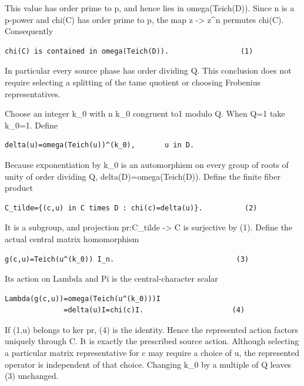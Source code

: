 This value has order prime to p, and hence lies in omega(Teich(D)).
Since n is a p-power and chi(C) has order prime to p, the map z
-\textgreater{} z\^{}n permutes chi(C). Consequently

\begin{Verbatim}[fontsize=\small,breaklines=true,breakanywhere=true]
chi(C) is contained in omega(Teich(D)).                 (1)
\end{Verbatim}

In particular every source phase has order dividing Q. This conclusion
does not require selecting a splitting of the tame quotient or choosing
Frobenius representatives.

Choose an integer k\_0 with n k\_0 congruent to1 modulo Q. When Q=1 take
k\_0=1. Define

\begin{Verbatim}[fontsize=\small,breaklines=true,breakanywhere=true]
delta(u)=omega(Teich(u))^(k_0),       u in D.
\end{Verbatim}

Because exponentiation by k\_0 is an automorphism on every group of
roots of unity of order dividing Q, delta(D)=omega(Teich(D)). Define the
finite fiber product

\begin{Verbatim}[fontsize=\small,breaklines=true,breakanywhere=true]
C_tilde={(c,u) in C times D : chi(c)=delta(u)}.          (2)
\end{Verbatim}

It is a subgroup, and projection pr:C\_tilde -\textgreater{} C is
surjective by (1). Define the actual central matrix homomorphism

\begin{Verbatim}[fontsize=\small,breaklines=true,breakanywhere=true]
g(c,u)=Teich(u^(k_0)) I_n.                             (3)
\end{Verbatim}

Its action on Lambda and Pi is the central-character scalar

\begin{Verbatim}[fontsize=\small,breaklines=true,breakanywhere=true]
Lambda(g(c,u))=omega(Teich(u^(k_0)))I
              =delta(u)I=chi(c)I.                     (4)
\end{Verbatim}

If (1,u) belongs to ker pr, (4) is the identity. Hence the represented
action factors uniquely through C. It is exactly the prescribed source
action. Although selecting a particular matrix representative for c may
require a choice of u, the represented operator is independent of that
choice. Changing k\_0 by a multiple of Q leaves (3) unchanged.

